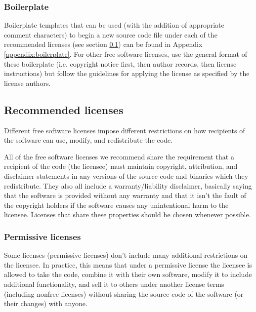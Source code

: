 \documentclass[10pt,a4paper]{article}
\begin{document}
\subsubsection{Boilerplate}

\par Boilerplate templates that can be used (with the addition of appropriate 
comment characters) to begin a new source code file under each of the 
recommended licenses (see section \ref{section:impnotes.recommended}) can 
be found in Appendix \ref{appendix:boilerplate}. For other free software licenses, 
use the general format of these boilerplate (i.e. copyright notice first, then 
author records, then license instructions) but follow the guidelines for applying 
the license as specified by the license authors. 


\subsection{Recommended licenses}
\label{section:impnotes.recommended}

\par Different free software licenses impose different restrictions on how recipients 
of the software can use, modify, and redistribute the code. 

\par All of the free software licenses we recommend share the requirement that 
a recipient of the code (the licensee) must maintain copyright, attribution, and disclaimer 
statements in any versions of the source code and binaries which they redistribute. 
They also all include a warranty/liability disclaimer, basically saying that the software 
is provided without any warranty and that it isn't the fault of the copyright holders if 
the software causes any unintentional harm to the licensee. Licenses that share these 
properties should be chosen whenever possible. 

\subsubsection{Permissive licenses}
\label{section:impnotes.recommended.permissive}
\par Some licenses (permissive licenses) don't include many additional restrictions on 
the licensee. In practice, this means that under a permissive license the licensee is 
allowed to take the code, combine it with their own software, modify it to include 
additional functionality, and sell it to others under another license terms (including 
nonfree licenses) without sharing the source code of the software (or their changes) 
with anyone. 
\end{document}
